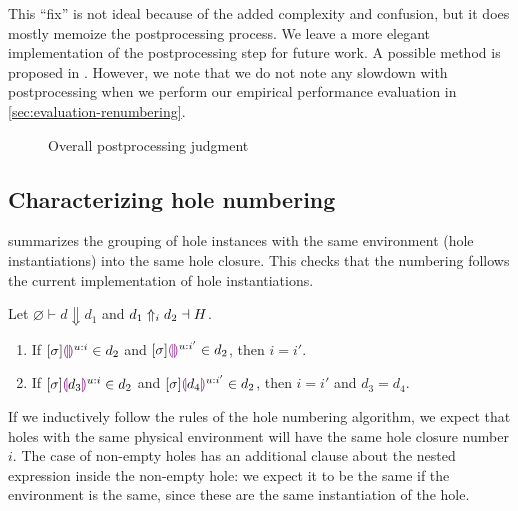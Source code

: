 This ``fix'' is not ideal because of the added complexity and confusion, but it does mostly memoize the postprocessing process. We leave a more elegant implementation of the postprocessing step for future work. A possible method is proposed in . However, we note that we do not note any slowdown with postprocessing when we perform our empirical performance evaluation in \cref{sec:evaluation-renumbering}.

\begin{figure}
  \centering
  \begin{mdframed}
    \begin{singlespace}
      
    \end{singlespace}
  \end{mdframed}
  \caption{Overall postprocessing judgment}
  \label{fig:big-step-postprocessing-rules}
\end{figure}

\subsection{Characterizing hole numbering}
\label{sec:hole-numbering-characterization}

 summarizes the grouping of hole instances with the same environment (hole instantiations) into the same hole closure. This checks that the numbering follows the current implementation of hole instantiations.

\begin{theorem}
  Let $\varnothing\vdash d\Downarrow d_1$ and $d_1\Uparrow_{i} d_2\dashv H$.
  \begin{enumerate}
  \item If $[\sigma]\textcolor{violet}{\llparenthesis}\textcolor{violet}{\rrparenthesis}^{u:i}\in d_2$ and $[\sigma]\textcolor{violet}{\llparenthesis}\textcolor{violet}{\rrparenthesis}^{u:i'}\in d_2$, then $i=i'$.
  \item If $[\sigma]\textcolor{violet}{\llparenthesis} d_3\textcolor{violet}{\rrparenthesis}^{u:i}\in d_2$ and $[\sigma]\textcolor{violet}{\llparenthesis} d_4\textcolor{violet}{\rrparenthesis}^{u:i'}\in d_2$, then $i=i'$ and $d_3=d_4$.
  \end{enumerate}
  \label{thm:hole-numbering-postprocessing}
\end{theorem}

If we inductively follow the rules of the hole numbering algorithm, we expect that holes with the same physical environment will have the same hole closure number $i$. The case of non-empty holes has an additional clause about the nested expression inside the non-empty hole: we expect it to be the same if the environment is the same, since these are the same instantiation of the hole.

